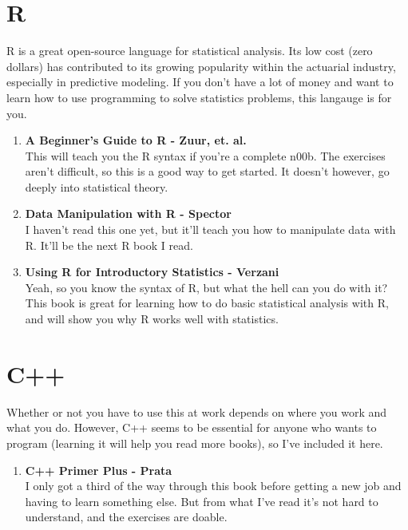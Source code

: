 \documentclass[oneside, titlepage]{article}
\begin{document}
\section{R}
R is a great open-source language for statistical analysis. Its low cost (zero dollars) has contributed to its growing popularity within the actuarial industry, especially in predictive modeling. If you don't have a lot of money and want to learn how to use programming to solve statistics problems, this langauge is for you.

\begin{enumerate}
\item{\bfseries A Beginner's Guide to R - Zuur, et. al.}\\
This will teach you the R syntax if you're a complete n00b. The exercises aren't difficult, so this is a good way to get started. It doesn't however, go deeply into statistical theory.

\item{\bfseries Data Manipulation with R - Spector}\\
I haven't read this one yet, but it'll teach you how to manipulate data with R. It'll be the next R book I read.

\item{\bfseries Using R for Introductory Statistics - Verzani}\\
Yeah, so you know the syntax of R, but what the hell can you do with it? This book is great for learning how to do basic statistical analysis with R, and will show you why R works well with statistics.
\end{enumerate}

\section{C++}
Whether or not you have to use this at work depends on where you work and what you do. However, C++ seems to be essential for anyone who wants to program (learning it will help you read more books), so I've included it here.

\begin{enumerate}
\item{\bfseries C++ Primer Plus - Prata}\\
I only got a third of the way through this book before getting a new job and having to learn something else. But from what I've read it's not hard to understand, and the exercises are doable.
\end{enumerate}
\end{document}
